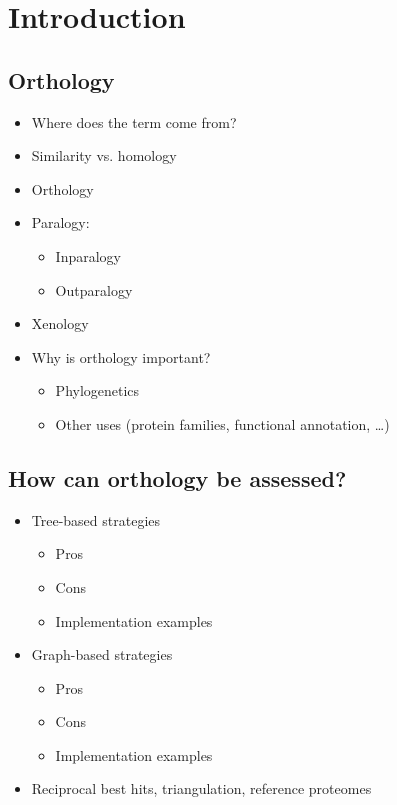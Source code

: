 \documentclass[a4paper]{scrartcl}
\begin{document}
\section{Introduction}

\subsection{Orthology}

\begin{itemize}
	\item Where does the term come from?
	\item Similarity vs. homology
	\item Orthology
	\item Paralogy:
	\begin{itemize}
		\item Inparalogy
		\item Outparalogy
	\end{itemize}
	\item Xenology
	\item Why is orthology important?
	\begin{itemize}
		\item Phylogenetics
		\item Other uses (protein families, functional annotation, \ldots)
	\end{itemize}
\end{itemize}

\subsection{How can orthology be assessed?}

\begin{itemize}
	\item Tree-based strategies
	\begin{itemize}
		\item Pros
		\item Cons
		\item Implementation examples
	\end{itemize}
	\item Graph-based strategies
	\begin{itemize}
		\item Pros
		\item Cons
		\item Implementation examples
	\end{itemize}
	\item Reciprocal best hits, triangulation, reference proteomes
\end{itemize}
\end{document}
